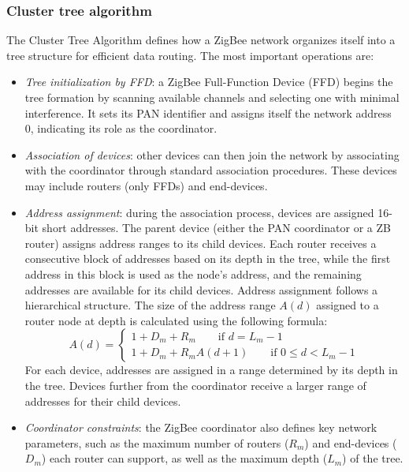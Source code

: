 \subsubsection{Cluster tree algorithm}
The Cluster Tree Algorithm defines how a ZigBee network organizes itself into a tree structure for efficient data routing.
The most important operations are: 
\begin{itemize}
    \item \textit{Tree initialization by FFD}: a ZigBee Full-Function Device (FFD) begins the tree formation by scanning available channels and selecting one with minimal interference. 
        It sets its PAN identifier and assigns itself the network address 0, indicating its role as the coordinator.
    \item \textit{Association of devices}: other devices can then join the network by associating with the coordinator through standard association procedures. 
        These devices may include routers (only FFDs) and end-devices.
    \item \textit{Address assignment}: during the association process, devices are assigned 16-bit short addresses. 
        The parent device (either the PAN coordinator or a ZB router) assigns address ranges to its child devices. 
        Each router receives a consecutive block of addresses based on its depth in the tree, while the first address in this block is used as the node's address, and the remaining addresses are available for its child devices.
        Address assignment follows a hierarchical structure. 
        The size of the address range $A(d)$ assigned to a router node at depth is calculated using the following formula:
        \[A(d)=\begin{cases} 1+D_m+R_m\qquad\text{if }d=L_m-1 \\ 1+D_m+R_mA(d+1)\qquad\text{if }0 \leq d <L_m-1 \end{cases}\]
        For each device, addresses are assigned in a range determined by its depth in the tree. 
        Devices further from the coordinator receive a larger range of addresses for their child devices.
    \item \textit{Coordinator constraints}: the ZigBee coordinator also defines key network parameters, such as the maximum number of routers ($R_m$) and end-devices ($D_m$) each router can support, as well as the maximum depth ($L_m$) of the tree.
\end{itemize}

